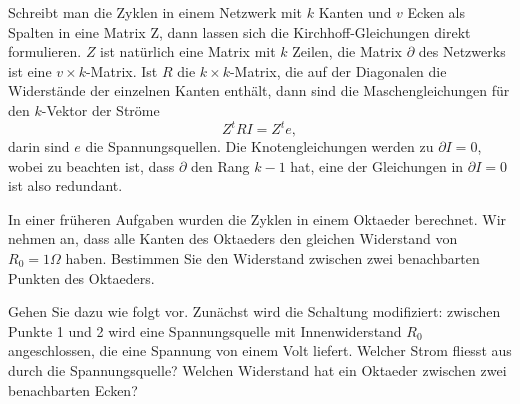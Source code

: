 Schreibt man die Zyklen in einem Netzwerk mit $k$ Kanten und $v$ Ecken
als Spalten in eine Matrix Z,
dann lassen sich die Kirchhoff-Gleichungen direkt formulieren.
$Z$ ist natürlich eine Matrix mit $k$ Zeilen, die Matrix $\partial$
des Netzwerks ist eine $v\times k$-Matrix.
Ist $R$ die $k\times k$-Matrix, die auf der Diagonalen die Widerstände der
einzelnen Kanten enthält, dann sind die Maschengleichungen für den
$k$-Vektor der Ströme 
\[
Z^tRI=Z^te,
\]
darin sind $e$ die Spannungsquellen.
Die Knotengleichungen werden zu $\partial I=0$, wobei zu beachten ist,
dass $\partial$ den Rang $k-1$ hat, eine der Gleichungen in $\partial I=0$ 
ist also redundant.

In einer früheren Aufgaben wurden die Zyklen in einem Oktaeder berechnet.
Wir nehmen an, dass alle Kanten des Oktaeders den gleichen Widerstand von
$R_0=1\Omega$ haben. Bestimmen Sie den Widerstand zwischen zwei benachbarten
Punkten des Oktaeders.

\begin{hinweis}
Gehen Sie dazu wie folgt vor.
Zunächst wird die Schaltung modifiziert: zwischen Punkte 1 und 2 wird eine
Spannungsquelle mit Innenwiderstand $R_0$ angeschlossen,
die eine Spannung von einem Volt liefert.
Welcher Strom fliesst aus durch die Spannungsquelle? Welchen Widerstand
hat ein Oktaeder zwischen zwei benachbarten Ecken?
\end{hinweis}

